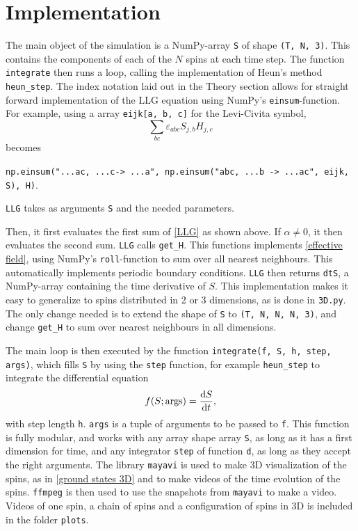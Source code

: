\documentclass{article}
\begin{document}
    \section*{Implementation}
    The main object of the simulation is a NumPy-array \verb|S| of shape \verb|(T, N, 3)|.
    This contains the components of each of the $N$ spins at each time step.
    The function \verb|integrate| then runs a loop, calling the implementation of Heun's method \verb|heun_step|.
    The index notation laid out in the Theory section allows for straight forward implementation of the LLG equation using NumPy's \verb|einsum|-function.
    For example, using a array \verb|eijk[a, b, c]| for the Levi-Civita symbol, 
    $$
    \sum_{b c}\varepsilon_{abc}S_{j, b}H_{j,c}
    $$
    becomes
    \begin{center}
        \verb|np.einsum("...ac, ...c-> ...a", np.einsum("abc, ...b -> ...ac", eijk, S), H)|.
    \end{center}
    \verb|LLG| takes as arguments \verb|S| and the needed parameters.
    
    Then, it first evaluates the first sum of \autoref{LLG} as shown above.
    If $\alpha \neq 0$, it then evaluates the second sum.
    \verb|LLG| calls \verb|get_H|.
    This functions implements \autoref{effective field}, using NumPy's \verb|roll|-function to sum over all nearest neighbours.
    This automatically implements periodic boundary conditions.
    \verb|LLG| then returns \verb|dtS|, a NumPy-array containing the time derivative of $S$.
    This implementation makes it easy to generalize to spins distributed in 2 or 3 dimensions, as is done in \verb|3D.py|.
    The only change needed is to extend the shape of \verb|S| to \verb|(T, N, N, N, 3)|, and change \verb|get_H| to sum over nearest neighbours in all dimensions.

    The main loop is then executed by the function \verb|integrate(f, S, h, step, args)|, which fills \verb|S| by using the \verb|step| function, for example \verb|heun_step| to integrate the differential equation
    \begin{equation*}
        f(S; \mathrm{args}) = \dv{S}{t},
    \end{equation*}
    with step length \verb|h|.
    \verb|args| is a tuple of arguments to be passed to \verb|f|.
    This function is fully modular, and works with any array shape array \verb|S|, as long as it has a first dimension for time, and any integrator \verb|step| of function \verb|d|, as long as they accept the right arguments.
    The library \verb|mayavi| is used to make 3D visualization of the spins, as in \autoref{ground states 3D} and to make videos of the time evolution of the spins.
    \verb|ffmpeg| is then used to use the snapshots from \verb|mayavi| to make a video.
    Videos of one spin, a chain of spins and a configuration of spins in 3D is included in the folder \verb|plots|.
\end{document}
